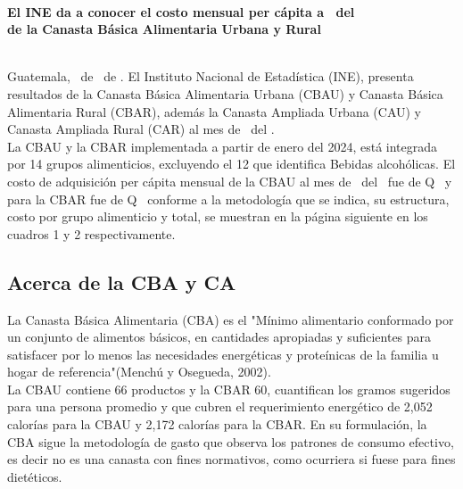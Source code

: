 \documentclass[letterpaper, twoside]{article}
\begin{document}
\setlength{\footskip}{49pt}
\color{AzulTexto}


\;
\\[\baselineskip]
\begin{center}
{\bf\large El INE da a conocer el costo mensual per cápita a \mes\ del \anio \\
  de la Canasta Básica Alimentaria Urbana y Rural}
\end{center}
\;
\\[\baselineskip]
Guatemala, \diapub\ de \mespub\ de \aniopub. El Instituto Nacional de Estadística
(INE), presenta resultados de la Canasta Básica Alimentaria Urbana (CBAU) y
Canasta Básica Alimentaria Rural (CBAR), además la Canasta Ampliada Urbana (CAU)
y Canasta Ampliada Rural (CAR) al mes de \mes\ del \anio.
\\[\baselineskip]
La CBAU y la CBAR implementada a partir de enero del 2024, está integrada por 14
grupos alimenticios, excluyendo el 12 que identifica Bebidas alcohólicas.
El costo de adquisición per cápita mensual de la CBAU al mes de \mes\ del \anio\
fue de Q \CBAU\ y para la CBAR fue de Q \CBAR\ conforme a la metodología que se
indica, su estructura, costo por grupo alimenticio y total, se muestran en la
página siguiente en los cuadros 1 y 2 respectivamente.

\setcounter{section}{1}
\subsection{Acerca de la CBA y CA}

La Canasta Básica Alimentaria (CBA) es el "Mínimo alimentario conformado por un
conjunto de alimentos básicos, en cantidades apropiadas y suficientes para
satisfacer por lo menos las necesidades energéticas y proteínicas de la familia
u hogar de referencia"(Menchú y Osegueda, 2002).
\\[\baselineskip]
La CBAU contiene 66 productos y la CBAR 60, cuantifican los gramos sugeridos
para una persona promedio y que cubren el requerimiento energético de 2,052
calorías para la CBAU y 2,172 calorías para la CBAR.
En su formulación, la CBA sigue la metodología de gasto que observa los patrones
de consumo efectivo, es decir no es una canasta con fines normativos, como
ocurriera si fuese para fines dietéticos.
\end{document}
